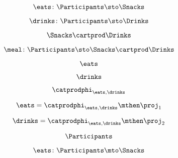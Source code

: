 {\begin{forslides}
        \begin{equation}
            \label{eq:combination-042}
            \eats \colon \Participants \sto \Snacks
        \end{equation}

        \begin{equation}
            \label{eq:combination-043}
            \drinks \colon  \Participants \sto \Drinks
        \end{equation}

        \begin{equation}
            \label{eq:combination-044}
            \Snacks\cartprod \Drinks
        \end{equation}

        \begin{equation}
            \label{eq:combination-045}
            \meal \colon \Participants\sto \Snacks\cartprod \Drinks
        \end{equation}

        \begin{equation}
            \label{eq:combination-046}
            \eats
        \end{equation}

        \begin{equation}
            \label{eq:combination-047}
            \drinks
        \end{equation}

        \begin{equation}
            \label{eq:combination-048}
            \catprodphi_{\eats,\drinks}
        \end{equation}

        \begin{equation}
            \label{eq:combination-049}
            \eats =\catprodphi_{\eats,\drinks}\mthen \proj_1
        \end{equation}

        \begin{equation}
            \label{eq:combination-050}
            \drinks=\catprodphi_{\eats,\drinks}\mthen \proj_2
        \end{equation}

        \begin{equation}
            \label{eq:combination-051}
            \Participants
        \end{equation}

        \begin{equation}
            \label{eq:combination-052}
            \eats\colon \Participants \mto \Snacks
        \end{equation}


\end{forslides}}
